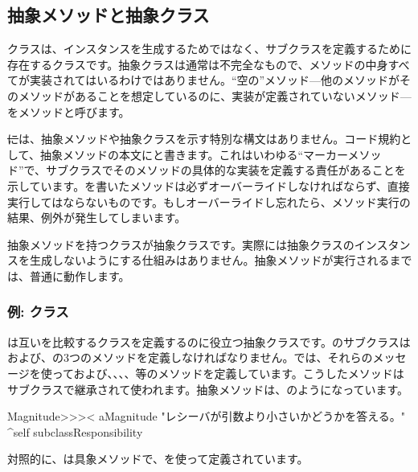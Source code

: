 \documentclass[a4paper,10pt,twoside]{book}
\begin{document}
\subsection{抽象メソッドと抽象クラス}

クラスは、インスタンスを生成するためではなく、サブクラスを定義するために存在するクラスです。抽象クラスは通常は不完全なもので、メソッドの中身すべてが実装されてはいるわけではありません。``空の''メソッド---他のメソッドがそのメソッドがあることを想定しているのに、実装が定義されていないメソッド---をメソッドと呼びます。

\st には、抽象メソッドや抽象クラスを示す特別な構文はありません。コード規約として、抽象メソッドの本文に\mbox{}と書きます。これはいわゆる``マーカーメソッド''で、サブクラスでそのメソッドの具体的な実装を定義する責任があることを示しています。を書いたメソッドは必ずオーバーライドしなければならず、直接実行してはならないものです。もしオーバーライドし忘れたら、メソッド実行の結果、例外が発生してしまいます。

抽象メソッドを持つクラスが抽象クラスです。実際には抽象クラスのインスタンスを生成しないようにする仕組みはありません。抽象メソッドが実行されるまでは、普通に動作します。

\subsubsection{例: クラス}
は互いを比較するクラスを定義するのに役立つ抽象クラスです。のサブクラスは\ct{<}および\ct{=}、の3つのメソッドを定義しなければなりません。では、それらのメッセージを使って\ct{>}および\ct{>=}、\ct{<=}、、、等のメソッドを定義しています。こうしたメソッドはサブクラスで継承されて使われます。抽象メソッドは、のようになっています。

\begin{method}[MagnitudeLessThan]{}
Magnitude>>>< aMagnitude 
	"レシーバが引数より小さいかどうかを答える。"
	^self subclassResponsibility
\end{method}

\noindent
対照的に、は具象メソッドで、\ct{<}を使って定義されています。
\end{document}
